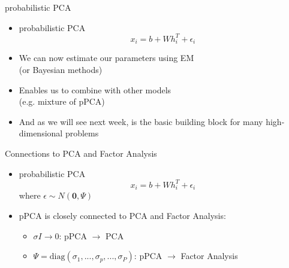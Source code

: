 \documentclass[10pt]{beamer}
\begin{document}
\begin{frame}{probabilistic PCA}

\begin{itemize}
\item probabilistic PCA
\[
x_i = b +  W h_i^T + \epsilon_i
\]
\pause
\item We can now {\color{uured} estimate our parameters} using EM \\ (or Bayesian methods)
\item Enables us to {\color{uured} combine with other models} \\ (e.g. mixture of pPCA)
\pause
\item And as we will see next week, is the {\color{uured} basic building block} for many high-dimensional problems
\end{itemize}

\end{frame}


\begin{frame}{Connections to PCA and Factor Analysis}

\begin{itemize}
\item probabilistic PCA
\[
x_i = b +  W h_i^T + \epsilon_i
\]
where $\epsilon \sim N(\mathbf{0}, \Psi)$
\item pPCA is closely connected to PCA and Factor Analysis:
\begin{itemize}
\item $\sigma I \rightarrow 0$: pPCA $\rightarrow$ {\color{uured} PCA}
\item $\Psi = \text{diag}(\sigma_1, ..., \sigma_p, ..., \sigma_P)$: pPCA $\rightarrow$ {\color{uured} Factor Analysis}
\end{itemize}
\end{itemize}

\end{frame}
\end{document}
